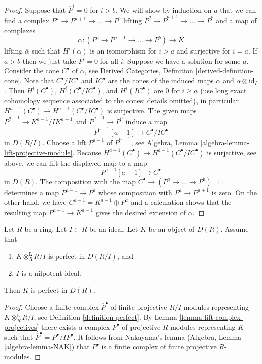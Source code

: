 \begin{proof}
\medskip\noindent
Suppose that $\overline{P}^i = 0$ for $i > b$. We will show by induction
on $a$ that we can find a complex
$P^a \to P^{a + 1} \to \ldots \to P^b$ lifting
$\overline{P}^a \to \overline{P}^{a + 1} \to \ldots \to \overline{P}^b$
and a map of complexes
$$
\alpha : (P^a \to P^{a + 1} \to \ldots \to P^b) \to K
$$
lifting $\overline{\alpha}$ such that $H^i(\alpha)$ is an isomorphism
for $i > a$ and surjective for $i = a$. If $a > b$ then we just take
$P^i = 0$ for all $i$. Suppose we have a solution for some $a$.
Consider the cone $C^\bullet$ of $\alpha$, see
Derived Categories, Definition \ref{derived-definition-cone}.
Note that $C^\bullet/IC^\bullet$ and $IC^\bullet$ are the
cones of the induced maps $\overline{\alpha}$ and $\alpha \otimes \text{id}_I$.
Then $H^i(C^\bullet)$, $H^i(C^\bullet/IC^\bullet)$, and
$H^i(IC^\bullet)$ are $0$ for $i \geq a$ (use long exact cohomology
sequence associated to the cones; details omitted),
in particular $H^{a - 1}(C^\bullet) \to H^{a - 1}(C^\bullet/IC^\bullet)$
is surjective. The given maps
$\overline{P}^{a - 1} \to K^{a - 1}/IK^{a - 1}$ and
$\overline{P}^{a - 1} \to \overline{P}^a$ induce a map
$$
\overline{P}^{a - 1}[a - 1] \to C^\bullet/IC^\bullet
$$
in $D(R/I)$. Choose a lift $P^{a - 1}$ of $\overline{P}^{a - 1}$, see
Algebra, Lemma \ref{algebra-lemma-lift-projective-module}.
Because $H^{a - 1}(C^\bullet) \to H^{a - 1}(C^\bullet/IC^\bullet)$
is surjective, see above, we can lift the displayed map to a map
$$
P^{a - 1}[a - 1] \to C^\bullet
$$
in $D(R)$. The composition with the map
$C^\bullet \to (P^a \to \ldots \to P^b)[1]$ determines a map
$P^{a - 1} \to P^a$ whose composition with $P^a \to P^{a + 1}$
is zero. On the other hand, we have $C^{a - 1} = K^{a - 1} \oplus P^a$
and a calculation shows that the resulting map $P^{a - 1} \to K^{a - 1}$
gives the desired extension of $\alpha$.
\end{proof}

\begin{lemma}
\label{lemma-perfect-modulo-nilpotent-ideal}
Let $R$ be a ring. Let $I \subset R$ be an ideal.
Let $K$ be an object of $D(R)$. Assume that
\begin{enumerate}
\item $K \otimes_R^\mathbf{L} R/I$ is perfect in $D(R/I)$, and
\item $I$ is a nilpotent ideal.
\end{enumerate}
Then $K$ is perfect in $D(R)$.
\end{lemma}

\begin{proof}
Choose a finite complex $\overline{P}^\bullet$ of finite projective
$R/I$-modules representing $K \otimes_R^\mathbf{L} R/I$, see
Definition \ref{definition-perfect}. By
Lemma \ref{lemma-lift-complex-projectives}
there exists a complex $P^\bullet$ of projective $R$-modules
representing $K$ such that $\overline{P}^\bullet = P^\bullet/IP^\bullet$.
It follows from Nakayama's lemma (Algebra, Lemma \ref{algebra-lemma-NAK})
that $P^\bullet$ is a finite complex of finite projective
$R$-modules.
\end{proof}

